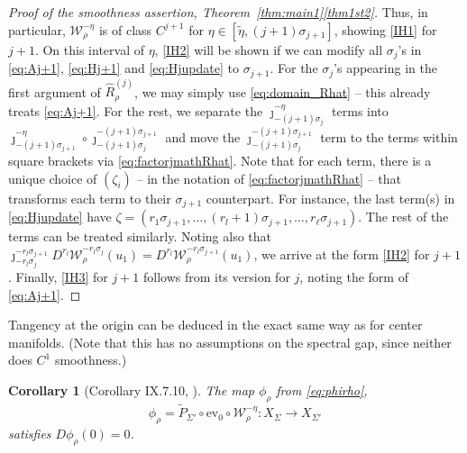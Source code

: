 \documentclass[a4paper, 12pt, oneside, reqno, notitlepage]{amsart}
\theoremstyle{plain}
\newtheorem{corollary}[theorem]{Corollary}
\theoremstyle{definition}
\theoremstyle{remark}
\begin{document}
\begin{proof}[Proof of the smoothness assertion, Theorem~\ref{thm:main1}\ref{thm1st2}]
Thus, in particular, $\mathcal{W}^{-\eta}_\rho$ is of class $C^{j+1}$ for $\eta \in [\tilde{\eta},(j+1)\sigma_{j+1}]$, showing \ref{IH1} for $j+1$.
On this interval of $\eta$, \ref{IH2} will be shown if we can modify all $\sigma_j$'s in \eqref{eq:Aj+1}, \eqref{eq:Hj+1} and \eqref{eq:Hjupdate} to $\sigma_{j+1}$.
For the $\sigma_j$'s appearing in the first argument of $\widehat{R}_\rho^{(j)}$, we may simply use \eqref{eq:domain_Rhat} -- this already treats \eqref{eq:Aj+1}.
For the rest, we separate the $\jmath_{-(j+1) \sigma_j}^{-\eta}$ terms into $\jmath_{-(j+1) \sigma_{j+1}}^{-\eta} \circ \jmath_{-(j+1) \sigma_j}^{-(j+1) \sigma_{j+1}}$ and move the $\jmath_{-(j+1) \sigma_j}^{-(j+1) \sigma_{j+1}}$ term to the terms within square brackets via \eqref{eq:factorjmathRhat}.
Note that for each term, there is a unique choice of $(\zeta_i)$ -- in the notation of \eqref{eq:factorjmathRhat} -- that transforms each term to their $\sigma_{j+1}$ counterpart.
For instance, the last term(s) in \eqref{eq:Hjupdate} have $\zeta = (r_1 \sigma_{j+1}, \ldots,(r_l+1)\sigma_{j+1},\ldots,r_\ell \sigma_{j+1})$.
The rest of the terms can be treated similarly.
Noting also that $\jmath^{-r_l \sigma_{j+1}}_{-r_l\sigma_j} D^{r_l} \mathcal{W}_\rho^{-r_l{\sigma_j}}(u_1) = D^{r_l} \mathcal{W}_\rho^{-r_l{\sigma_{j+1}}}(u_1) $, we arrive at the form \ref{IH2} for $j + 1$.
Finally, \ref{IH3} for $j+1$ follows from its version for $j$, noting the form of \eqref{eq:Aj+1}.
\end{proof}



Tangency at the origin can be deduced in the exact same way as for center manifolds.
(Note that this has no assumptions on the spectral gap, since neither does $C^1$ smoothness.)

\begin{corollary}[Corollary IX.7.10, \cite{diekmann2012delay}] \label{corollary:tangency}
    The map $\phi_\rho$ from \eqref{eq:phirho},
    \begin{displaymath}
        \phi_\rho = \widetilde{P}_{\Sigma'} \circ\mathrm{ev}_0 \circ \mathcal{W}^{-\eta}_\rho:X_\Sigma \to X_{\Sigma'}
    \end{displaymath}
    satisfies $D\phi_\rho (0) = 0$.
\end{corollary}
\end{document}
